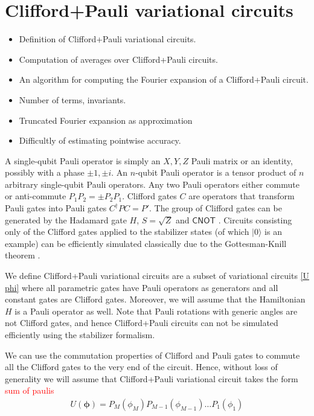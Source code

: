 \documentclass[twocolumn, amsfonts, amssymb, aps, nofootinbib]{revtex4-2}
\newcommand{\CX}{\textsf{CNOT }}
\newcommand{\comment}[1]{\textcolor{red}{#1}}
\newcommand{\CP}{Clifford+Pauli}
\begin{document}
\section{\CP{} variational circuits}
\begin{itemize}
	\item Definition of \CP{} variational circuits.
	\item Computation of averages over \CP{} circuits.
	\item An algorithm for computing the Fourier expansion of a \CP{} circuit.
	\item Number of terms, invariants.
	\item Truncated Fourier expansion as approximation
	\item Difficultly of estimating pointwise accuracy.
\end{itemize}
A single-qubit Pauli operator is simply an $X, Y, Z$ Pauli matrix or an identity, possibly with a phase $\pm1, \pm i$. An $n$-qubit Pauli operator is a tensor product of $n$ arbitrary single-qubit Pauli operators. Any two Pauli operators either commute or anti-commute $P_1P_2=\pm P_2P_1$. Clifford gates $C$ are operators that transform Pauli gates into Pauli gates $C^\dagger P C=P'$. The group of Clifford gates can be generated by the Hadamard gate $H$, $S=\sqrt{Z}$ and $\CX$. Circuits consisting only of the Clifford gates applied to the stabilizer states (of which $|0\rangle$ is an example) can be efficiently simulated classically due to the Gottesman-Knill theorem \cite{Aaronson2004}.

We define \CP{} variational circuits are a subset of variational circuits \eqref{U phi} where all parametric gates have Pauli operators as generators and all constant gates are Clifford gates. Moreover, we will assume that the Hamiltonian $H$ is a Pauli operator as well. Note that Pauli rotations with generic angles are not Clifford gates, and hence \CP{} circuits can not be simulated efficiently using the stabilizer formalism. 


We can use the commutation properties of Clifford and Pauli gates to commute all the Clifford gates to the very end of the circuit. Hence, without loss of generality we will assume that \CP{} variational circuit takes the form \comment{sum of paulis}
\begin{align}
	U(\pmb\phi)=P_M(\phi_M)P_{M-1}(\phi_{M-1})\dots P_1(\phi_1)
\end{align}
\end{document}

